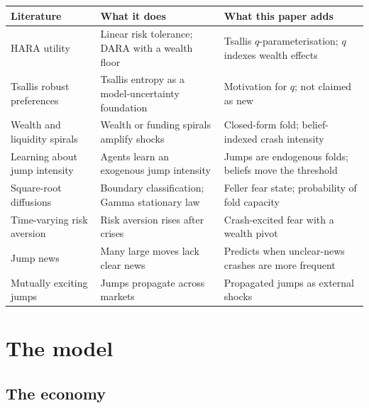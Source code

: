 \documentclass[11pt,a4paper]{article}
\theoremstyle{remark}
\begin{document}
\begin{center}
\small
\begin{tabularx}{\textwidth}{>{\raggedright\arraybackslash}p{4.3cm}>{\raggedright\arraybackslash}X>{\raggedright\arraybackslash}X}
\toprule
Literature & What it does & What this paper adds \\
\midrule
HARA utility \citep{Merton1971,Pollak1971} & Linear risk tolerance; DARA with a wealth floor & Tsallis $q$-parameterisation; $q$ indexes wealth effects \\
Tsallis robust preferences \citep{MeyerGohde2019,Tian2022} & Tsallis entropy as a model-uncertainty foundation & Motivation for $q$; not claimed as new \\
Wealth and liquidity spirals \citep{GennotteLeland1990,KyleXiong2001,BrunnermeierPedersen2009} & Wealth or funding spirals amplify shocks & Closed-form fold; belief-indexed crash intensity \\
Learning about jump intensity \citep{Benzoni2011} & Agents learn an exogenous jump intensity & Jumps are endogenous folds; beliefs move the threshold \\
Square-root diffusions \citep{Feller1951,CIR1985} & Boundary classification; Gamma stationary law & Feller fear state; probability of fold capacity \\
Time-varying risk aversion \citep{CampbellCochrane1999,Cohn2015,GuisoSapienzaZingales2018} & Risk aversion rises after crises & Crash-excited fear with a wealth pivot \\
Jump news \citep{CutlerPoterbaSummers1989,BBDS2021} & Many large moves lack clear news & Predicts when unclear-news crashes are more frequent \\
Mutually exciting jumps \citep{Hawkes1971,AitSahalia2015} & Jumps propagate across markets & Propagated jumps as external shocks \\
\bottomrule
\end{tabularx}
\end{center}

\section{The model}

\subsection{The economy}
\end{document}
